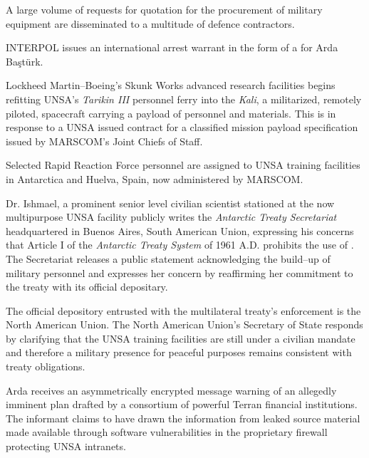 A large volume of requests for quotation for the procurement of military equipment are disseminated to a multitude of defence contractors.
\StopTimelineDate

INTERPOL issues an international arrest warrant in the form of a  for Arda Baştürk.
\StopTimelineDate

Lockheed Martin--Boeing's Skunk Works advanced research facilities begins refitting UNSA's {\it Tarikin III} personnel ferry into the {\it Kali}, a militarized, remotely piloted, spacecraft carrying a payload of personnel and materials. This is in response to a UNSA issued contract for a classified mission payload specification issued by MARSCOM's Joint Chiefs of Staff.
\StopTimelineDate

Selected Rapid Reaction Force personnel are assigned to UNSA training facilities in Antarctica and Huelva, Spain, now administered by MARSCOM. 

Dr. Ishmael, a prominent senior level civilian scientist stationed at the now multipurpose UNSA facility publicly writes the {\it Antarctic Treaty Secretariat} headquartered in Buenos Aires, South American Union, expressing his concerns that Article I of the {\it Antarctic Treaty System} of 1961 A.D. prohibits the use of . The Secretariat releases a public statement acknowledging the build--up of military personnel and expresses her concern by reaffirming her commitment to the treaty with its official depositary. 

The official depository entrusted with the multilateral treaty's enforcement is the North American Union. The North American Union's Secretary of State responds by clarifying that the UNSA training facilities are still under a civilian mandate and therefore a military presence for peaceful purposes remains consistent with treaty obligations.
\StopTimelineDate

Arda receives an asymmetrically encrypted message warning of an allegedly imminent plan drafted by a consortium of powerful Terran financial institutions. The informant claims to have drawn the information from leaked source material made available through software vulnerabilities in the proprietary firewall protecting UNSA intranets. 


